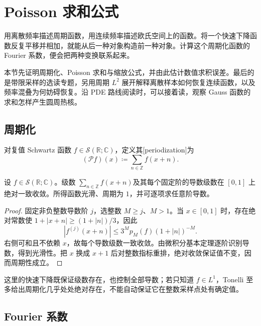 \section{Poisson 求和公式}
\label{b2:sec:0601}

用离散频率描述周期函数，用连续频率描述欧氏空间上的函数。将一个快速下降函数反复平移并相加，就能从后一种对象构造前一种对象。计算这个周期化函数的 Fourier 系数，便会把两种变换联系起来。

本节先证明周期化、Poisson 求和与缩放公式，并由此估计数值求积误差。最后的是带限采样的选读专题，另用周期 \(L^2\) 展开解释离散样本如何恢复连续函数，以及频率混叠为何妨碍恢复。沿 PDE 路线阅读时，可以接着读，观察 Gauss 函数的求和怎样产生圆周热核。

\subsection{周期化}
\label{b2:subsec:060101}

\begin{definition}\label{b2:def:06-periodization}
对复值 Schwartz 函数 \(f\in\mathcal S(\mathbb R;\mathbb C)\)，定义其[periodization]为
\[
 (\mathcal Pf)(x)\coloneqq\sum_{n\in\mathbb Z}f(x+n).
\]
\end{definition}

\begin{proposition}\label{b2:prop:06-periodization-smooth}
设 \(f\in\mathcal S(\mathbb R;\mathbb C)\)。级数 \(\sum_{n\in\mathbb Z}f(x+n)\)及其每个固定阶的导数级数在 \([0,1]\) 上绝对一致收敛。所得函数光滑、周期为 \(1\)，并可逐项求任意阶导数。
\end{proposition}
\begin{proof}
固定非负整数导数阶 \(j\)，选整数 \(M\geq j\)、\(M>1\)。当 \(x\in[0,1]\) 时，存在绝对常数使 \(1+|x+n|\geq(1+|n|)/3\)，因此
\[
 |f^{(j)}(x+n)|\leq3^M p_M(f)(1+|n|)^{-M}.
\]
右侧可和且不依赖 \(x\)，故每个导数级数一致收敛。由微积分基本定理逐阶识别导数，得到光滑性。把 \(x\) 换成 \(x+1\) 后对整数指标重排，绝对收敛保证值不变，因而周期性成立。
\end{proof}

这里的快速下降既保证级数存在，也控制全部导数；若只知道 \(f\in L^1\)，Tonelli 至多给出周期化几乎处处绝对存在，不能自动保证它在整数采样点处有确定值。

\subsection{Fourier 系数}
\label{b2:subsec:060102}

